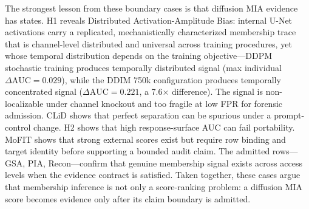 \documentclass[10pt,conference]{IEEEtran}
\begin{document}
The strongest lesson from these boundary cases is that diffusion MIA evidence
has states. H1 reveals Distributed Activation-Amplitude Bias: internal U-Net
activations carry a replicated, mechanistically characterized membership trace
that is channel-level distributed and universal across training procedures, yet
whose temporal distribution depends on the training objective---DDPM stochastic
training produces temporally distributed signal (max individual
$\Delta\text{AUC}{=}0.029$), while the DDIM 750k configuration produces
temporally concentrated signal ($\Delta\text{AUC}{=}0.221$, a 7.6$\times$
difference). The signal is non-localizable under channel knockout and too fragile
at low FPR for forensic admission. CLiD shows that perfect separation can be
spurious under a prompt-control change. H2 shows that high response-surface AUC
can fail portability. MoFIT shows that strong external scores exist but require
row binding and target identity before supporting a bounded audit claim. The
admitted rows---GSA, PIA, Recon---confirm that genuine membership signal exists
across access levels when the evidence contract is satisfied. Taken together,
these cases argue that membership inference is not only a score-ranking problem:
a diffusion MIA score becomes evidence only after its claim boundary is admitted.



\end{document}
